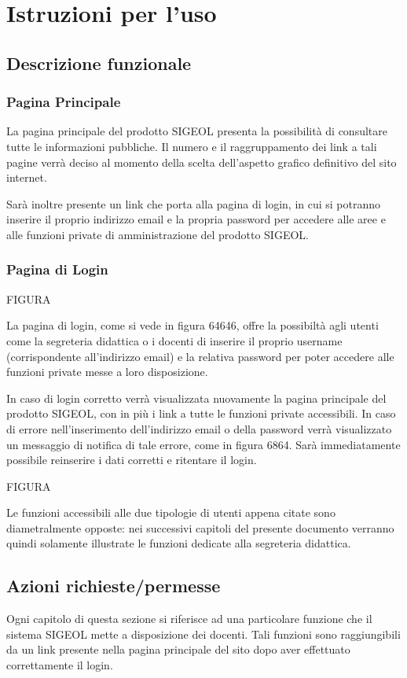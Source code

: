 \documentclass[11pt,a4paper]{article}
\begin{document}
\section{Istruzioni per l'uso}
\subsection{Descrizione funzionale}
\subsubsection{Pagina Principale}
La pagina principale del prodotto SIGEOL presenta la possibilità di consultare tutte le informazioni pubbliche. Il numero e il raggruppamento dei link a tali pagine verrà deciso al momento della scelta dell'aspetto grafico definitivo del sito internet.

Sarà inoltre presente un link che porta alla pagina di login, in cui si potranno inserire il proprio indirizzo email e la propria password per accedere alle aree e alle funzioni private di amministrazione del prodotto SIGEOL.
\subsubsection{Pagina di Login}
\begin{LARGE}FIGURA\end{LARGE}

La pagina di login, come si vede in figura 64646, offre la possibiltà agli utenti come la segreteria didattica o i docenti di inserire il proprio username (corrispondente all'indirizzo email) e la relativa password per poter accedere alle funzioni private messe a loro disposizione.

In caso di login corretto verrà visualizzata nuovamente la pagina principale del prodotto SIGEOL, con in più i link a tutte le funzioni private accessibili.
In caso di errore nell'inserimento dell'indirizzo email o della password verrà visualizzato un messaggio di notifica di tale errore, come in figura 6864.
Sarà immediatamente possibile reinserire i dati corretti e ritentare il login.

\begin{LARGE}FIGURA\end{LARGE}

Le funzioni accessibili alle due tipologie di utenti appena citate sono diametralmente opposte: nei successivi capitoli del presente documento verranno quindi solamente illustrate le funzioni dedicate alla segreteria didattica.
\subsection{Azioni richieste/permesse}
Ogni capitolo di questa sezione si riferisce ad una particolare funzione che il sistema SIGEOL mette a disposizione dei docenti. Tali funzioni sono raggiungibili da un link presente nella pagina principale del sito dopo aver effettuato correttamente il login.
\end{document}
